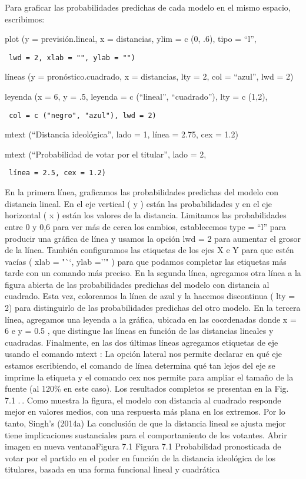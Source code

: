 \documentclass[
]{book}
\begin{document}
Para graficar las probabilidades predichas de cada modelo en el mismo espacio, escribimos:

plot (y = previsión.lineal, x = distancias, ylim = c (0, .6), tipo = ``l'',

\begin{verbatim}
 lwd = 2, xlab = "", ylab = "")
\end{verbatim}

líneas (y = pronóstico.cuadrado, x = distancias, lty = 2, col = ``azul'', lwd = 2)

leyenda (x = 6, y = .5, leyenda = c (``lineal'', ``cuadrado''), lty = c (1,2),

\begin{verbatim}
 col = c ("negro", "azul"), lwd = 2)
\end{verbatim}

mtext (``Distancia ideológica'', lado = 1, línea = 2.75, cex = 1.2)

mtext (``Probabilidad de votar por el titular'', lado = 2,

\begin{verbatim}
 línea = 2.5, cex = 1.2)
\end{verbatim}

En la primera línea, graficamos las probabilidades predichas del modelo con distancia lineal. En el eje vertical ( y ) están las probabilidades y en el eje horizontal ( x ) están los valores de la distancia. Limitamos las probabilidades entre 0 y 0,6 para ver más de cerca los cambios, establecemos type = ``l'' para producir una gráfica de línea y usamos la opción lwd = 2 para aumentar el grosor de la línea. También configuramos las etiquetas de los ejes X e Y para que estén vacías ( xlab = "``, ylab =''" ) para que podamos completar las etiquetas más tarde con un comando más preciso. En la segunda línea, agregamos otra línea a la figura abierta de las probabilidades predichas del modelo con distancia al cuadrado. Esta vez, coloreamos la línea de azul y la hacemos discontinua ( lty = 2) para distinguirlo de las probabilidades predichas del otro modelo. En la tercera línea, agregamos una leyenda a la gráfica, ubicada en las coordenadas donde x = 6 e y = 0.5 , que distingue las líneas en función de las distancias lineales y cuadradas. Finalmente, en las dos últimas líneas agregamos etiquetas de eje usando el comando mtext : La opción lateral nos permite declarar en qué eje estamos escribiendo, el comando de línea determina qué tan lejos del eje se imprime la etiqueta y el comando cex nos permite para ampliar el tamaño de la fuente (al 120\% en este caso). Los resultados completos se presentan en la Fig. 7.1 . . Como muestra la figura, el modelo con distancia al cuadrado responde mejor en valores medios, con una respuesta más plana en los extremos. Por lo tanto, Singh's (2014a) La conclusión de que la distancia lineal se ajusta mejor tiene implicaciones sustanciales para el comportamiento de los votantes.
Abrir imagen en nueva ventanaFigura 7.1
Figura 7.1
Probabilidad pronosticada de votar por el partido en el poder en función de la distancia ideológica de los titulares, basada en una forma funcional lineal y cuadrática
\end{document}
